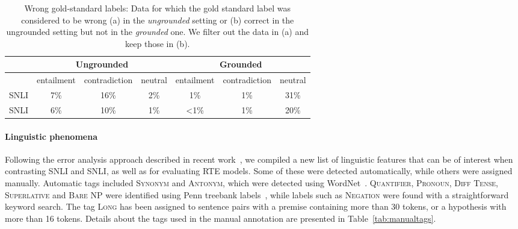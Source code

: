 \documentclass[11pt]{article}
\begin{document}
\begin{table}
    \small
    \begin{center}
        \begin{tabular}{|l|ccc|ccc|}
        	\hline
            & \multicolumn{3}{|c}{Ungrounded} & \multicolumn{3}{|c|}{Grounded}\\\hline
            & entailment & contradiction & neutral & entailment & contradiction & neutral\\\hline
            SNLI & 7\% & 16\% & 2\% & 1\% & 1\% & 31\% \\
            SNLI & 6\% & 10\% & 1\% & \textless1\% & 1\% & 20\%\\\hline
        \end{tabular}
        \caption{Wrong gold-standard labels: Data for which the gold standard label was considered to be wrong (a) in the \emph{ungrounded} setting or (b) correct in the ungrounded setting but not in the \emph{grounded} one. We filter out the data in (a) and keep those in (b). }\label{tab:changedlabels}
    \end{center}
\end{table}

\paragraph{Linguistic phenomena}
Following the error analysis approach described
in recent work~\cite{Nangia2017,Williams2018}, we compiled a new list
of linguistic features that can be of interest when contrasting SNLI
and SNLI, as well as for evaluating RTE models. Some of these
were detected automatically, while others were assigned manually. Automatic tags included \textsc{Synonym} and \textsc{Antonym}, which were detected using WordNet~\cite{Miller1995}.
 \textsc{Quantifier}, \textsc{Pronoun}, \textsc{Diff Tense}, \textsc{Superlative} and \textsc{Bare NP} were identified using Penn treebank labels~\cite{Marcus1993}, while labels such as \textsc{Negation} were found with a straightforward keyword search.
The tag \textsc{Long} has been assigned to sentence pairs with a premise containing more than 30 tokens,
or a hypothesis with more than 16 tokens.
Details about the tags used in the manual annotation are presented in Table~\ref{tab:manualtags}.
\end{document}
